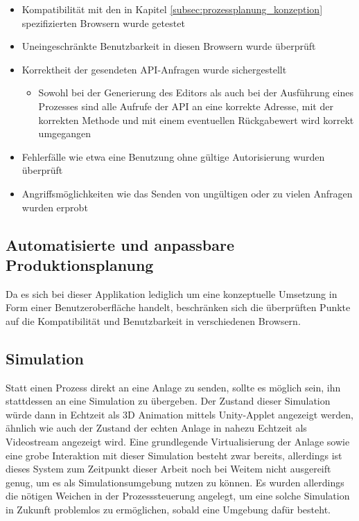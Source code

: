 \begin{itemize}
    \item Kompatibilität mit den in Kapitel \ref{subsec:prozessplanung_konzeption} spezifizierten Browsern wurde getestet
    \item Uneingeschränkte Benutzbarkeit in diesen Browsern wurde überprüft
    \item Korrektheit der gesendeten API-Anfragen wurde sichergestellt
    \begin{itemize}
        \item Sowohl bei der Generierung des Editors als auch bei der Ausführung eines Prozesses sind alle Aufrufe der API an eine korrekte Adresse, mit der korrekten Methode und mit einem eventuellen Rückgabewert wird korrekt umgegangen
    \end{itemize}
    \item Fehlerfälle wie etwa eine Benutzung ohne gültige Autorisierung wurden überprüft
    \item Angriffsmöglichkeiten wie das Senden von ungültigen oder zu vielen Anfragen wurden erprobt
\end{itemize}

\subsection*{Automatisierte und anpassbare Produktionsplanung}

Da es sich bei dieser Applikation lediglich um eine konzeptuelle Umsetzung in Form einer Benutzeroberfläche handelt, beschränken sich die überprüften Punkte auf die Kompatibilität und Benutzbarkeit in verschiedenen Browsern.

\subsection{Simulation}
\label{subsec:simulation}

Statt einen Prozess direkt an eine Anlage zu senden, sollte es möglich sein, ihn stattdessen an eine Simulation zu übergeben. Der Zustand dieser Simulation würde dann in Echtzeit als 3D Animation mittels Unity-Applet angezeigt werden, ähnlich wie auch der Zustand der echten Anlage in nahezu Echtzeit als Videostream angezeigt wird. Eine grundlegende Virtualisierung der Anlage sowie eine grobe Interaktion mit dieser Simulation besteht zwar bereits, allerdings ist dieses System zum Zeitpunkt dieser Arbeit noch bei Weitem nicht ausgereift genug, um es als Simulationsumgebung nutzen zu können. Es wurden allerdings die nötigen Weichen in der Prozesssteuerung angelegt, um eine solche Simulation in Zukunft problemlos zu ermöglichen, sobald eine Umgebung dafür besteht.

